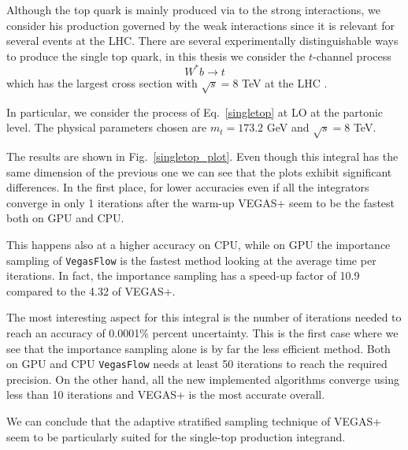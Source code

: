 \documentclass[../main/main.tex]{subfiles}
\begin{document}
Although the top quark is mainly produced via to the strong interactions, we consider his production governed by the weak interactions since it is relevant for several events at the LHC. There are several experimentally distinguishable ways to produce the single top quark, in this thesis we consider the $t$-channel process 
\begin{equation}
	\label{singletop}
	W^* b \to t 
\end{equation}
which has the largest cross section with  $\sqrt{s} = 8$ TeV at the LHC \cite{Brucherseifer_2014}.

In particular, we consider the process of Eq.~\ref{singletop} at LO at the partonic level. The physical parameters chosen are $m_t = 173.2$ GeV and $\sqrt{s} = 8$ TeV.

The results are shown in Fig.~\ref{singletop_plot}.
Even though this integral has the same dimension of the previous one we can see that the plots exhibit significant differences.
In the first place, for lower accuracies even if all the integrators converge in only 1 iterations after the warm-up VEGAS+ seem to be the fastest both on GPU and CPU. 

This happens also at a higher accuracy on CPU, while on GPU the importance sampling of \texttt{VegasFlow} is the fastest method looking at the average time per iterations. In fact, the importance sampling has a speed-up factor of 10.9 compared to the 4.32 of VEGAS+.

The most interesting aspect for this integral is the number of iterations needed to reach an accuracy of 0.0001\% percent uncertainty.  This is the first case where we see that the importance sampling alone is by far the less efficient method. Both on GPU and CPU \texttt{VegasFlow} needs at least 50 iterations to reach the required precision. On the other hand, all the new implemented algorithms converge using less than 10 iterations and VEGAS+ is the most accurate overall.

We can conclude that the adaptive stratified sampling technique of VEGAS+ seem to be particularly suited for the single-top production integrand.
\end{document}
